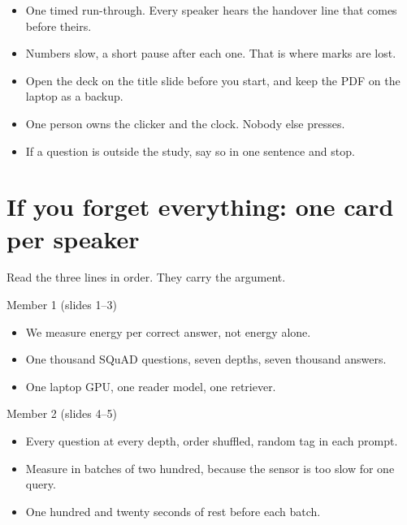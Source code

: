 \documentclass[11pt,a4paper]{article}
\begin{document}
\vspace{10pt}
\begin{checkcard}
\begin{itemize}[leftmargin=1.2em,itemsep=2pt,topsep=0pt]
  \item One timed run-through. Every speaker hears the handover line that comes before theirs.
  \item Numbers slow, a short pause after each one. That is where marks are lost.
  \item Open the deck on the title slide before you start, and keep the PDF on the laptop as a backup.
  \item One person owns the clicker and the clock. Nobody else presses.
  \item If a question is outside the study, say so in one sentence and stop.
\end{itemize}
\end{checkcard}

\newpage

\section{If you forget everything: one card per speaker}

{\small\color{muted}Read the three lines in order. They carry the argument.\par}

\begin{card}{Member 1 \textnormal{\small (slides 1--3)}}
\begin{itemize}[leftmargin=1.2em,itemsep=3pt,topsep=1pt]
  \item We measure energy per correct answer, not energy alone.
  \item One thousand SQuAD questions, seven depths, seven thousand answers.
  \item One laptop GPU, one reader model, one retriever.
\end{itemize}
\end{card}

\begin{card}{Member 2 \textnormal{\small (slides 4--5)}}
\begin{itemize}[leftmargin=1.2em,itemsep=3pt,topsep=1pt]
  \item Every question at every depth, order shuffled, random tag in each prompt.
  \item Measure in batches of two hundred, because the sensor is too slow for one query.
  \item One hundred and twenty seconds of rest before each batch.
\end{itemize}
\end{card}
\end{document}
